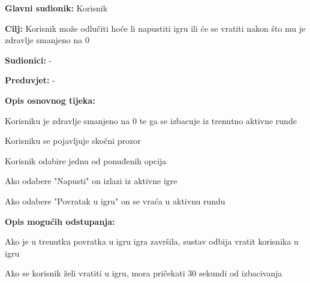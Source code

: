 					
								\noindent {}
					\begin{packed_item}
						
						\item \textbf{Glavni sudionik: } Korisnik
						\item  \textbf{Cilj:} Korisnik može odlučiti hoće li napustiti igru ili će se vratiti nakon što mu je zdravlje smanjeno na 0
						\item  \textbf{Sudionici:} -
						\item  \textbf{Preduvjet:} -
						\item  \textbf{Opis osnovnog tijeka:}
						
						\item[] \begin{packed_enum}
							
							\item Korisniku je zdravlje smanjeno na 0 te ga se izbacuje iz trenutno aktivne runde
							\item Korisniku se pojavljuje skočni prozor 
							\item Korisnik odabire jednu od ponuđenih opcija
							\item Ako odabere "Napusti" on izlazi iz aktivne igre
							\item Ako odabere "Povratak u igru" on se vraća u aktivnu rundu
						\end{packed_enum}
						
						\item  \textbf{Opis mogućih odstupanja:}
						
						\item[] \begin{packed_item}
							
							\item[5.b] 
							\item[] \begin{packed_enum}
								
								\item Ako je u trenutku povratka u igru igra završila, sustav odbija vratit korisnika u igru
								\item Ako se korisnik želi vratiti u igru, mora pričekati 30 sekundi od izbacivanja 
								
							\end{packed_enum}
							
						\end{packed_item}
					\end{packed_item}
				
